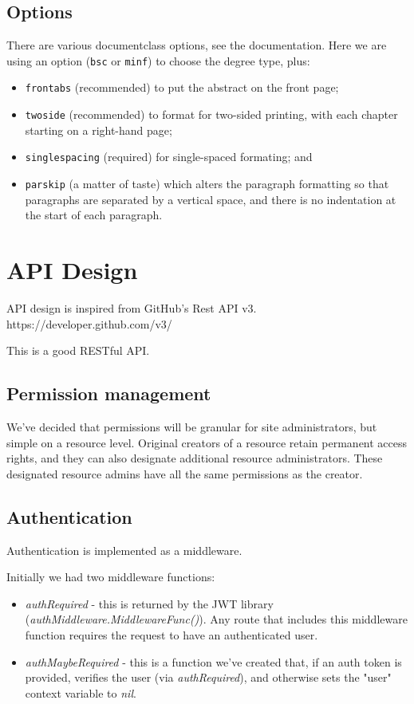\documentclass[bsc,frontabs,twoside,singlespacing,parskip,deptreport]{infthesis}     %
\begin{document}
\section{Options}

There are various documentclass options, see the documentation.  Here we are
using an option ({\tt bsc} or {\tt minf}) to choose the degree type, plus:
\begin{itemize}
\item {\tt frontabs} (recommended) to put the abstract on the front page;
\item {\tt twoside} (recommended) to format for two-sided printing, with
  each chapter starting on a right-hand page;
\item {\tt singlespacing} (required) for single-spaced formating; and
\item {\tt parskip} (a matter of taste) which alters the paragraph formatting so that
paragraphs are separated by a vertical space, and there is no
indentation at the start of each paragraph.
\end{itemize}

\chapter{API Design}

API design is inspired from GitHub's Rest API v3. https://developer.github.com/v3/

This is a good RESTful API.

\section{Permission management}

We've decided that permissions will be granular for site administrators, but simple on a resource level. Original creators of a resource retain permanent access rights, and they can also designate additional resource administrators. These designated resource admins have all the same permissions as the creator.

\section{Authentication}

Authentication is implemented as a middleware.

Initially we had two middleware functions:
\begin{itemize}
  \item \emph{authRequired} - this is returned by the JWT library \\ (\emph{authMiddleware.MiddlewareFunc()}). Any route that includes this middleware function requires the request to have an authenticated user.
  \item \emph{authMaybeRequired} - this is a function we've created that, if an auth token is provided, verifies the user (via \emph{authRequired}), and otherwise sets the "user" context variable to \emph{nil}.
\end{itemize}
\end{document}
